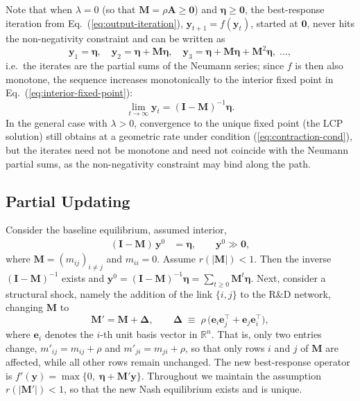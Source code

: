 Note that when $\lambda=0$ (so that $\mathbf{M}=\rho\mathbf{A}\ge\mathbf{0}$) and $\boldsymbol{\eta}\ge\mathbf 0$, the best-response iteration from Eq.~(\ref{eq:output-iteration}), $\mathbf y_{t+1}=f(\mathbf y_{t})$, started at $\mathbf 0$, never hits the non-negativity constraint and can be written as
\[
\mathbf y_{1}=\boldsymbol{\eta},\quad
\mathbf y_{2}=\boldsymbol{\eta}+\mathbf{M}\boldsymbol{\eta},\quad
\mathbf y_{3}=\boldsymbol{\eta}+\mathbf{M}\boldsymbol{\eta}+\mathbf{M}^{2}\boldsymbol{\eta},
\;\ldots,
\]
i.e.\ the iterates are the partial sums of the Neumann series; since $f$ is then also monotone, the sequence increases monotonically to the interior fixed point in Eq.~(\ref{eq:interior-fixed-point}):
\[
\lim_{t\to\infty}\mathbf y_{t}=(\mathbf{I}-\mathbf{M})^{-1}\boldsymbol{\eta}.
\]
In the general case with $\lambda>0$, convergence to the unique fixed point (the LCP solution) still obtains at a geometric rate under condition (\ref{eq:contraction-cond}), but the iterates need not be monotone and need not coincide with the Neumann partial sums, as the non-negativity constraint may bind along the path.

\subsection{Partial Updating}
\label{sec:br-part}
Consider the baseline equilibrium, assumed interior,
\begin{align}
(\mathbf I-\mathbf M)\,\mathbf y^{0} &= \boldsymbol{\eta},
\qquad \mathbf y^{0}\gg\mathbf 0,
\label{eq:E0}
\end{align}
where $\mathbf M=(m_{ij})_{i\neq j}$ and $m_{ii}=0$. Assume $r(|\mathbf M|)<1$. Then the inverse $(\mathbf I-\mathbf M)^{-1}$ exists and
\(\displaystyle
\mathbf y^{0}
   =(\mathbf I-\mathbf M)^{-1}\boldsymbol{\eta}
   =\sum_{t\ge0}\mathbf M^{t}\boldsymbol{\eta}\).
Next, consider a structural shock, namely the addition of the link $\{i,j\}$ to the R\&D network, changing $\mathbf M$ to
\begin{equation}
\mathbf M' = \mathbf M + \boldsymbol{\Delta},
\qquad
\boldsymbol{\Delta}
   \;\equiv\;
   \rho\,\bigl(\mathbf e_i\mathbf e_j^{\top}+\mathbf e_j\mathbf e_i^{\top}\bigr),
\label{eq:Delta}
\end{equation}
where $\mathbf e_i$ denotes the $i$-th unit basis vector in $\mathbb R^n$. That is, only two entries change, $m'_{ij}=m_{ij}+\rho$ and $m'_{ji}=m_{ji}+\rho$, so that only rows $i$ and $j$ of $\mathbf M$ are affected, while all other rows remain unchanged. The new best-response operator is
$f'(\mathbf y)=\max\{0,\;\boldsymbol{\eta}+\mathbf M'\mathbf y\}$. Throughout we maintain the assumption
$r(|\mathbf M'|)<1$, so that the new Nash equilibrium exists and is unique.

